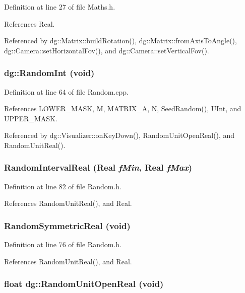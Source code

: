 Definition at line 27 of file Maths.h.

References Real.

Referenced by dg::Matrix::build\-Rotation(), dg::Matrix::from\-Axis\-To\-Angle(), dg::Camera::set\-Horizontal\-Fov(), and dg::Camera::set\-Vertical\-Fov().
\subsubsection{ dg::Random\-Int (void)}\label{namespacedg_a167}




Definition at line 64 of file Random.cpp.

References LOWER\_\-MASK, M, MATRIX\_\-A, N, Seed\-Random(), UInt, and UPPER\_\-MASK.

Referenced by dg::Visualizer::on\-Key\-Down(), Random\-Unit\-Open\-Real(), and Random\-Unit\-Real().
\subsubsection{ Random\-Interval\-Real ({\bf Real} {\em f\-Min}, {\bf Real} {\em f\-Max})\hspace{0.3cm}{\tt  [inline]}}\label{namespacedg_a171}




Definition at line 82 of file Random.h.

References Random\-Unit\-Real(), and Real.
\subsubsection{ Random\-Symmetric\-Real (void)\hspace{0.3cm}{\tt  [inline]}}\label{namespacedg_a170}




Definition at line 76 of file Random.h.

References Random\-Unit\-Real(), and Real.
\subsubsection{\setlength{\rightskip}{0pt plus 5cm}float dg::Random\-Unit\-Open\-Real (void)}\label{namespacedg_a169}




